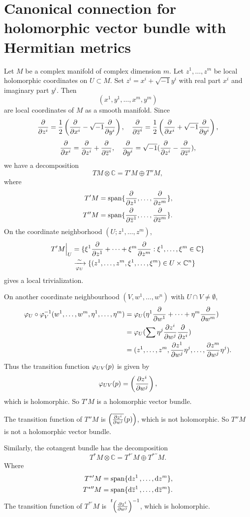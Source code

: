\section{Canonical connection for holomorphic vector bundle with Hermitian metrics}
Let \(M\) be a complex manifold of complex dimension \(m\). Let \(z^1,\ldots,z^m\)
be local holomorphic coordinates on \(U\subset M\). Set \(z^i=x^i+\sqrt{-1}y^i\) with
real part \(x^i\) and imaginary part \(y^i\). Then \[
  (x^1,y^1,\ldots,x^m,y^m)
\] are local coordinates of \(M\) as a smooth manifold. Since \[
  \pdv{z^i}=\frac{1}{2}\left(\pdv{x^i}-\sqrt{-1}\pdv{y^i}\right),\quad
  \pdv{\overline{z}^i}=\frac{1}{2}\left(\pdv{x^i}+\sqrt{-1}\pdv{y^i}\right),
\] \[
  \pdv{x^i}=\pdv{z^i}+\pdv{\overline{z}^i},\quad
  \pdv{y^i}=\sqrt{-1}(\pdv{z^i}-\pdv{\overline{z}^i}),
\] we have a decomposition \[
  TM\otimes \mathbb{C}=T'M\oplus T''M
,\] where
\begin{align*}
  T'M&=\operatorname{span}\{\pdv{z^1},\ldots,\pdv{z^m}\}, \\
  T''M&=\operatorname{span}\{\pdv{\overline{z}^1},\ldots,\pdv{\overline{z}^m}\}
.\end{align*}
On the coordinate neighborhood \((U;z^1,\ldots,z^m)\),
\begin{align*}
  T'M\Big|_U&=\{\xi^1\pdv{z^1}+\cdots +\xi^m\pdv{z^m}:
  \xi^1,\ldots,\xi^m\in \mathbb{C}\} \\
  &\xrightarrow[\varphi_U]{\sim}\{(z^1,\ldots,z^m,\xi^1,\ldots,\xi^m)\in
  U\times \mathbb{C}^n\}
\end{align*}
gives a local trivialization.

On another coordinate neighbourhood \((V,w^1,\ldots,w^n)\) with \(U\cap V\neq
\emptyset\),
\begin{align*}
  \varphi_U\circ \varphi_V^{-1}(w^1,\ldots,w^m,\eta^1,\ldots,\eta^m)
  &=\varphi_U(\eta^1\pdv{w^1}+\cdots+\eta^m\pdv{w^m}) \\
  &=\varphi_U(\sum \eta^j\pdv{z^i}{w^j}\pdv{z^i}) \\
  &=(z^1,\ldots,z^m,\pdv{z^1}{w^j}\eta^j,\ldots,\pdv{z^m}{w^j}\eta^j)
.\end{align*}
Thus the transition function \(\varphi_{UV}(p)\) is given by \[
  \varphi_{UV}(p)=\left(\pdv{z^i}{w^j}(p)\right)
,\] which is holomorphic. So \(T'M\) is a holomorphic vector bundle.

The transition function of \(T''M\) is \(\left(\overline{\pdv{z^i}{w^j}}(p)\right)\),
which is not holomorphic. So \(T''M\) is not a holomorphic vector bundle.

Similarly, the cotangent bundle has the decomposition \[
  T^*M\otimes \mathbb{C}=T^{*\prime}M\oplus T^{*\prime\prime}M
.\] Where
\begin{align*}
  T^{*\prime}M&=\operatorname{span}\{\dd{z^1},\ldots,\dd{z^m}\}, \\
  T^{*\prime\prime}M&=\operatorname{span}\{\dd{\overline{z}^1},\ldots,\dd{\overline{z}^m}\}
.\end{align*}
The transition function of \(T^{*\prime}M\) is \(\tensor[^t]{\left(\pdv{z^i}{w^j}
\right)}{^{-1}}\), which is holomorphic.

